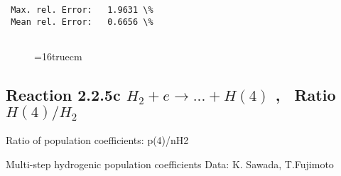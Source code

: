 \documentclass[12pt,dvipdfmx]{article}
\begin{document}
\begin{small}
\begin{verbatim}
 Max. rel. Error:   1.9631 \%
 Mean rel. Error:   0.6656 \%


\end{verbatim}\end{small}
\begin{figure} \label{2.2.5b}
\epsfxsize=16truecm
\end{figure}
\newpage

\subsection{
Reaction 2.2.5c  $H_2 + e \rightarrow ...+ H(4) $ , \   Ratio $H(4)/H_2 $
}

 Ratio of population coefficients: p(4)/nH2

 Multi-step hydrogenic population coefficients
 Data: K. Sawada, T.Fujimoto \cite{kn:Sawada}
\end{document}
